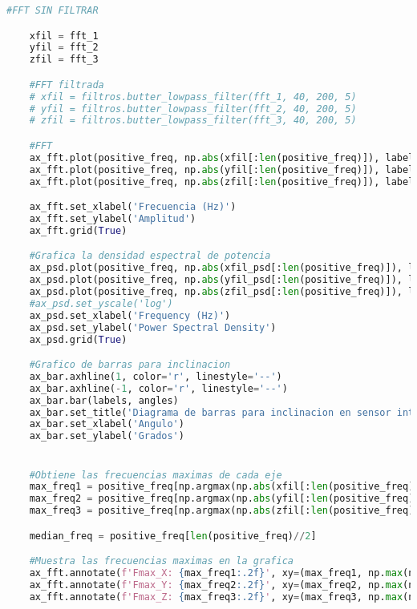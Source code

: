\begin{lstlisting}[language=Python, caption=Código para interfaz gráfica de control y monitoreo]
    #FFT SIN FILTRAR

    xfil = fft_1
    yfil = fft_2
    zfil = fft_3

    #FFT filtrada
    # xfil = filtros.butter_lowpass_filter(fft_1, 40, 200, 5)
    # yfil = filtros.butter_lowpass_filter(fft_2, 40, 200, 5)
    # zfil = filtros.butter_lowpass_filter(fft_3, 40, 200, 5)

    #FFT
    ax_fft.plot(positive_freq, np.abs(xfil[:len(positive_freq)]), label='Espectro Eje X')
    ax_fft.plot(positive_freq, np.abs(yfil[:len(positive_freq)]), label='Espectro Eje Y')
    ax_fft.plot(positive_freq, np.abs(zfil[:len(positive_freq)]), label='Espectro Eje Z')

    ax_fft.set_xlabel('Frecuencia (Hz)')
    ax_fft.set_ylabel('Amplitud')
    ax_fft.grid(True)

    #Grafica la densidad espectral de potencia
    ax_psd.plot(positive_freq, np.abs(xfil_psd[:len(positive_freq)]), label='Densidad Espectral X')
    ax_psd.plot(positive_freq, np.abs(yfil_psd[:len(positive_freq)]), label='Densidad Espectral Y')
    ax_psd.plot(positive_freq, np.abs(zfil_psd[:len(positive_freq)]), label='Densidad Espectral Z')
    #ax_psd.set_yscale('log')
    ax_psd.set_xlabel('Frequency (Hz)')
    ax_psd.set_ylabel('Power Spectral Density')
    ax_psd.grid(True)

    #Grafico de barras para inclinacion
    ax_bar.axhline(1, color='r', linestyle='--')  
    ax_bar.axhline(-1, color='r', linestyle='--') 
    ax_bar.bar(labels, angles)
    ax_bar.set_title('Diagrama de barras para inclinacion en sensor inteligente')
    ax_bar.set_xlabel('Angulo')
    ax_bar.set_ylabel('Grados')


    #Obtiene las frecuencias maximas de cada eje
    max_freq1 = positive_freq[np.argmax(np.abs(xfil[:len(positive_freq)]))]
    max_freq2 = positive_freq[np.argmax(np.abs(yfil[:len(positive_freq)]))]
    max_freq3 = positive_freq[np.argmax(np.abs(zfil[:len(positive_freq)]))]

    median_freq = positive_freq[len(positive_freq)//2]

    #Muestra las frecuencias maximas en la grafica
    ax_fft.annotate(f'Fmax_X: {max_freq1:.2f}', xy=(max_freq1, np.max(np.abs(xfil[:len(positive_freq)]))), xytext=(-10 if max_freq1 > median_freq else 10,30), textcoords='offset points', arrowprops=dict(arrowstyle='->'))
    ax_fft.annotate(f'Fmax_Y: {max_freq2:.2f}', xy=(max_freq2, np.max(np.abs(yfil[:len(positive_freq)]))), xytext=(-10 if max_freq2 > median_freq else 10,10), textcoords='offset points', arrowprops=dict(arrowstyle='->'))
    ax_fft.annotate(f'Fmax_Z: {max_freq3:.2f}', xy=(max_freq3, np.max(np.abs(zfil[:len(positive_freq)]))), xytext=(-10 if max_freq3 > median_freq else 10,-10), textcoords='offset points', arrowprops=dict(arrowstyle='->'))


\end{lstlisting}
